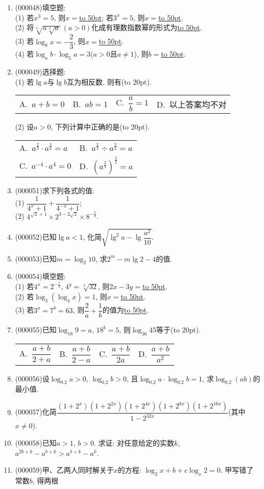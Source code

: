 \documentclass[10pt,a4paper]{article}
\newcommand{\blank}[1]{\underline{\hbox to #1pt{}}}
\newcommand{\bracket}[1]{(\hbox to #1pt{})}
\newcommand{\twoch}[4]{\par\begin{tabular}{p{.46\textwidth}p{.46\textwidth}}
A.~#1& B.~#2\\
C.~#3& D.~#4
\end{tabular}}
\newcommand{\fourch}[4]{\par\begin{tabular}{p{.23\textwidth}p{.23\textwidth}p{.23\textwidth}p{.23\textwidth}}
A.~#1 &B.~#2& C.~#3& D.~#4
\end{tabular}}
\begin{document}
\begin{enumerate}[1.]

\item {\tiny (000048)}填空题:\\
(1) 若$x^3=5$, 则$x=$\blank{50}; 若$3^x=5$, 则$x=$\blank{50}.\\
(2) 将$\sqrt[4]{a\sqrt[3]{a}} \ (a>0)$化成有理数指数幂的形式为\blank{50}.\\
(3) 若$\log_8x=-\dfrac 23$, 则$x=$\blank{50}.\\
(4) 若$\log_a b\cdot \log_5 a=3$($a>0$且$a\ne 1$), 则$b=$\blank{50}.
\item {\tiny (000049)}选择题:\\
(1) 若$\lg a$与$\lg b$互为相反数, 则有\bracket{20}.
\fourch{$a+b=0$}{$ab=1$}{$\dfrac ab=1$}{以上答案均不对}
(2) 设$a>0$, 下列计算中正确的是\bracket{20}.
\twoch{$a^\frac{2}{3}\cdot a^\frac{3}{2}=a$}{$a^\frac{2}{3}\div a^\frac{3}{2}=a$}{$a^{-4}\cdot a^4=0$}{$(a^\frac{2}{3})^\frac{3}{2}=a$}
\item {\tiny (000051)}求下列各式的值:\\
(1) $\dfrac{1}{4^x+1}+\dfrac{1}{4^{-x}+1}$;\\
(2) $4^{\sqrt 2+1}\times 2^{3-2\sqrt 2}\times 8^{-\frac 23}$.
\item {\tiny (000052)}已知$\lg a<1$, 化简$\sqrt{\lg^2 a-\lg \dfrac{a^2}{10}}$.
\item {\tiny (000053)}已知$m=\log_2 10$, 求$2^m-m\lg 2-4$的值.
\item {\tiny (000054)}填空题:\\
(1) 若$4^x=2^{-\frac{1}{2}}$, $4^y=\sqrt[3]{32}$, 则$2x-3y=$\blank{50}.\\
(2) 若$\log_3(\log_4 x)=1$, 则$x=$\blank{50}.\\
(3) 若$3^a=7^b=63$, 则$\dfrac 2a+\dfrac 1b$的值为\blank{50}.\\
\item {\tiny (000055)}已知$\log_{18}9=a$, $18^b=5$, 则$\log_{36}45$等于\bracket{20}.
\fourch{$\dfrac{a+b}{2+a}$}{$\dfrac{a+b}{2-a}$}{$\dfrac{a+b}{2a}$}{$\dfrac{a+b}{a^2}$}
\item {\tiny (000056)}设$\log_{0.2}a>0$, $\log_{0.2}b>0$, 且$\log_{0.2}a\cdot \log_{0.2}b=1$, 求$\log_{0.2}(ab)$的最小值.
\item {\tiny (000057)}化简$\dfrac{(1+2^x)(1+2^{2x})(1+2^{4x})(1+2^{8x})(1+2^{16x})}{1-2^{32x}}$(其中$x\ne 0$).
\item {\tiny (000058)}已知$a>1$, $b>0$. 求证: 对任意给定的实数$k$, $a^{2b+k}-a^{b+k}>a^{b+k}-a^k$.
\item {\tiny (000059)}甲、乙两人同时解关于$x$的方程: $\log_2x+b+c\log_x2=0$. 甲写错了常数$b$, 得两根

\end{enumerate}
\end{document}
